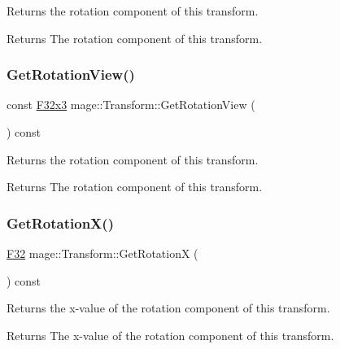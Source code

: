 Returns the rotation component of this transform.

\begin{DoxyReturn}{Returns}
The rotation component of this transform. 
\end{DoxyReturn}
\mbox{\label{classmage_1_1_transform_ae1542afb8ef71242f9b082383106a19b}} 
\subsubsection{\texorpdfstring{Get\+Rotation\+View()}{GetRotationView()}}
{\footnotesize\ttfamily const \mbox{\hyperlink{namespacemage_a1e3c7a882af461f161caa1cbddaf1fa2}{F32x3}} mage\+::\+Transform\+::\+Get\+Rotation\+View (\begin{DoxyParamCaption}{ }\end{DoxyParamCaption}) const\hspace{0.3cm}{\ttfamily [noexcept]}}

Returns the rotation component of this transform.

\begin{DoxyReturn}{Returns}
The rotation component of this transform. 
\end{DoxyReturn}
\mbox{\label{classmage_1_1_transform_ad3e1b49ccac234303ff28c8aea6f8e4a}} 
\subsubsection{\texorpdfstring{Get\+Rotation\+X()}{GetRotationX()}}
{\footnotesize\ttfamily \mbox{\hyperlink{namespacemage_aa97e833b45f06d60a0a9c4fc22ae02c0}{F32}} mage\+::\+Transform\+::\+Get\+RotationX (\begin{DoxyParamCaption}{ }\end{DoxyParamCaption}) const\hspace{0.3cm}{\ttfamily [noexcept]}}

Returns the x-\/value of the rotation component of this transform.

\begin{DoxyReturn}{Returns}
The x-\/value of the rotation component of this transform. 
\end{DoxyReturn}
\mbox{\label{classmage_1_1_transform_ac1962d03093b3671fcfb6a9b4f410628}} 
